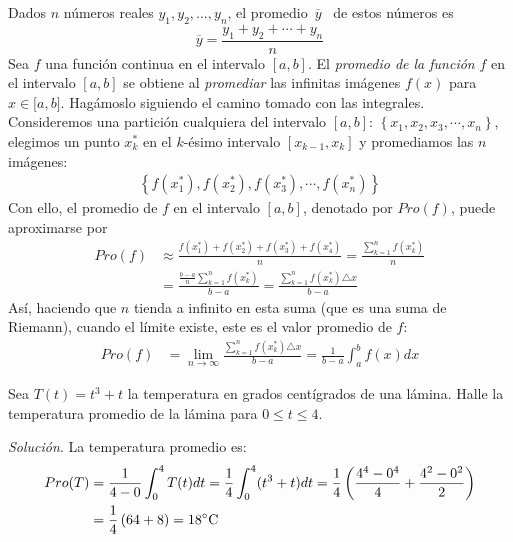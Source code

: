 Dados $n$ números reales $y_{1},y_{2},...,y_{n}$, el promedio\ $\overline{y}$%
\ de estos números es
\[
\overline{y}=\frac{y_{1}+y_{2}+\cdots+y_{n}}{n}
\]
Sea $f$ una función continua en el intervalo $[a,b]$. El \textit{promedio de la
función} $f$ en el intervalo $[a,b]$ se obtiene al \textit{promediar} las infinitas imágenes $f\left( x\right) $ para $x\in \lbrack a,b]$. Hagámoslo siguiendo el camino tomado con las integrales. Consideremos una partición cualquiera del intervalo $\left[ a,b\right]$: $\left\{ x_{1},x_{2},x_{3},\cdots ,x_{n}\right\} $,
elegimos un punto $x_{k}^{\ast }$ en el $k$-ésimo intervalo $%
[x_{k-1},x_{k}]$ y promediamos las $n$ imágenes:
\begin{align*}
 \left\{ f\left( x_{1}^{\ast
}\right) ,f\left( x_{2}^{\ast }\right) ,f\left( x_{3}^{\ast }\right) ,\cdots
,f\left( x_{n}^{\ast }\right) \right\}
\end{align*}
Con ello, el promedio de $f$ en el intervalo $[a,b]$, denotado por $Pro\left( f\right) $, puede aproximarse por
\begin{align*}
Pro\left( f\right) &\approx \frac{f\left( x_{1}^{\ast }\right) +f\left(
x_{2}^{\ast }\right) +f\left( x_{3}^{\ast }\right) +f\left( x_{4}^{\ast
}\right) }{n}=\frac{\sum_{k=1}^{n}f\left( x_{k}^{\ast }\right) }{n}
\\&
=\frac{\frac{b-a}{n}\sum_{k=1}^{n}f\left( x_{k}^{\ast }\right) }{b-a}=\frac{\sum_{k=1}^{n}f\left( x_{k}^{\ast }\right) \triangle x}{b-a}
\end{align*}
Así, haciendo que $n$ tienda a infinito en esta suma (que es una
suma de Riemann), cuando el límite existe, este es el valor promedio de $f$:
\begin{align*}
Pro\left( f\right)&=\lim_{n\rightarrow \infty }\frac{\sum_{k=1}^{n}f\left(
x_{k}^{\ast }\right) \triangle x}{b-a}=\frac{1}{b-a}\int_{a}^{b}f\left(
x\right) dx
\end{align*}

\begin{ejemplo}
\textnormal{Sea \textit{$T\left( t\right) =t^{3}+t$} la temperatura en grados centígrados de una lámina. Halle la temperatura promedio de la lámina para \textit{$0\leq t\leq
4.$}}
\end{ejemplo}


\textit{Solución}.
La temperatura promedio es:
{\small
\begin{align*}
Pro(T)&=\frac{1}{4-0}\int_{0}^{4}T(t)dt %
=\frac{1}{4}\int_{0}^{4}(t^{3}+t)dt=\frac{1}{4}\left( \frac{4^{4}-0^{4}}{4}+\frac{4^{2}-0^{2}}{2}\right) \\
&=\frac{1}{4}\left(64+8\right)=18^{\circ }\textnormal{C}
\end{align*}
}


